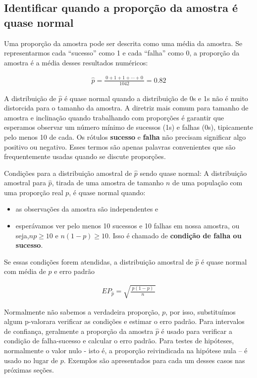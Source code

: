 \documentclass[
]{book}
\theoremstyle{definition}
\theoremstyle{definition}
\theoremstyle{definition}
\theoremstyle{definition}
\theoremstyle{remark}
\begin{document}
\hypertarget{identifySampleProportionAlmostNormal}{%
\subsection{Identificar quando a proporção da amostra é quase normal}\label{identifySampleProportionAlmostNormal}}

Uma proporção da amostra pode ser descrita como uma média da amostra. Se representarmos cada ``sucesso'' como 1 e cada ``falha'' como 0, a proporção da amostra é a média desses resultados numéricos:

\begin{eqnarray*}
\hat{p} = \frac{\ 0 + 1 + 1 + \cdots + 0\ }{1042} = 0.82
\end{eqnarray*}

A distribuição de \(\hat{p}\) é quase normal quando a distribuição de 0s e 1s não é muito distorcida para o tamanho da amostra. A diretriz mais comum para tamanho de amostra e inclinação quando trabalhando com proporções é garantir que esperamos observar um número mínimo de sucessos (1s) e falhas (0s), tipicamente pelo menos 10 de cada. Os rótulos \textbf{sucesso} e \textbf{falha} não precisam significar algo positivo ou negativo. Esses termos são apenas palavras convenientes que são frequentemente usadas quando se discute proporções.

Condições para a distribuição amostral de \(\hat{p}\) sendo quase normal: A distribuição amostral para \(\hat{p}\), tirada de uma amostra de tamanho \(n\) de uma população com uma proporção real \(p\), é quase normal quando:

\begin{itemize}
\item
  as observações da amostra são independentes e
\item
  esperávamos ver pelo menos 10 sucessos e 10 falhas em nossa amostra, ou seja,\(np\geq10\) e \(n(1-p)\geq10\). Isso é chamado de \textbf{condição de falha ou sucesso}.
\end{itemize}

Se essas condições forem atendidas, a distribuição amostral de \(\hat{p}\) é quase normal com média de \(p\) e erro padrão

\begin{eqnarray}
EP_{\hat{p}} = \sqrt{\frac{\ p(1-p)\ }{n}}
\label{eq:seOfPHat}
\end{eqnarray}

Normalmente não sabemos a verdadeira proporção, \(p\), por isso, substituímos algum p-valorara verificar as condições e estimar o erro padrão. Para intervalos de confiança, geralmente a proporção da amostra \(\hat{p}\) é usado para verificar a condição de falha-sucesso e calcular o erro padrão. Para testes de hipóteses, normalmente o valor nulo - isto é, a proporção reivindicada na hipótese nula -- é usado no lugar de \(p\). Exemplos são apresentados para cada um desses casos nas próximas seções.
\end{document}
